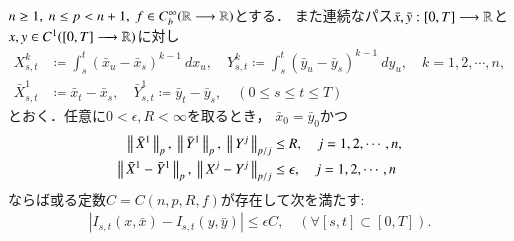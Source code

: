 	\begin{screen}
		\begin{thm}[連続性定理拡張]
			$n \geq 1,\ n \leq p < n+1,\ f \in C^\infty_b(\mathbb{R} \longrightarrow \mathbb{R})$\footnotemark とする．
			また連続なパス$\bar{x},\bar{y}:[0,T] \longrightarrow \mathbb{R}$と
			$x,y \in C^1([0,T] \longrightarrow \mathbb{R})$に対し
			\begin{align}
				X^k_{s,t} &\coloneqq \int_s^t (\bar{x}_u - \bar{x}_s)^{k-1}\ dx_u,
				\quad Y^k_{s,t} \coloneqq \int_s^t (\bar{y}_u - \bar{y}_s)^{k-1}\ dy_u,
				\quad k=1,2,\cdots,n, \\
				\bar{X}^1_{s,t} &\coloneqq \bar{x}_t - \bar{x}_s,
				\quad \bar{Y}^1_{s,t} \coloneqq \bar{y}_t - \bar{y}_s,
				\quad (0 \leq s \leq t \leq T)
			\end{align}
			とおく．任意に$0 < \epsilon, R < \infty$を取るとき，
			$\bar{x}_0 = \bar{y}_0$かつ
			\begin{align}
				\Norm{\bar{X}^1}{p},\ \Norm{\bar{Y}^1}{p},\ \Norm{Y^j}{p/j} &\leq R,
				\quad j=1,2,\cdots,n, \\
				\Norm{\bar{X}^1 - \bar{Y}^1}{p},\ \Norm{X^j - Y^j}{p/j} &\leq \epsilon,
				\quad j=1,2,\cdots,n
			\end{align}
			ならば或る定数$C = C(n,p,R,f)$が存在して次を満たす:
			\begin{align}
				\left| I_{s,t}(x,\bar{x}) - I_{s,t}(y,\bar{y}) \right| \leq \epsilon C,
				\quad (\forall [s,t] \subset [0,T]).
			\end{align}
		\end{thm}
	\end{screen}
